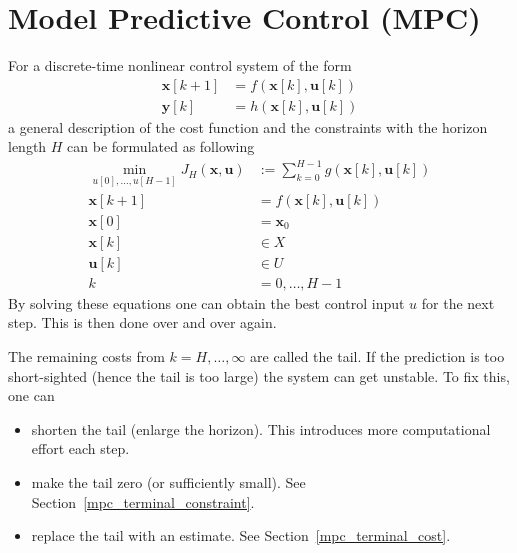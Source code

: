 \section{Model Predictive Control (MPC)}

For a discrete-time nonlinear control system of the form
\begin{align*}
    \mathbf{x}[k+1] & = f(\mathbf{x}[k], \mathbf{u}[k]) \\
    \mathbf{y}[k]   & = h(\mathbf{x}[k],\mathbf{u}[k])
\end{align*}
a general description of the cost function and the constraints with the horizon length $H$ can be formulated as following
\begin{align*}
    \min_{u[0], \ldots, u[H-1]} J_{H}(\mathbf{x,u}) & := \sum_{k=0}^{H-1}g(\mathbf{x}[k],\mathbf{u}[k]) \\
    \mathbf{x}[k+1]                                 & = f(\mathbf{x}[k], \mathbf{u}[k])                 \\
    \mathbf{x}[0]                                   & = \mathbf{x}_0                                    \\
    \mathbf{x}[k]                                   & \in X                                             \\
    \mathbf{u}[k]                                   & \in U                                             \\
    k                                               & = 0,\ldots,H-1
\end{align*}
By solving these equations one can obtain the best control input $u$ for the next step. This is then done over and over again.

\newpar{}

The remaining costs from $k=H, \ldots, \infty$ are called the tail. If the prediction is too short-sighted (hence the tail is too large) the system can get unstable. To fix this, one can
\begin{itemize}
    \item shorten the tail (enlarge the horizon). This introduces more computational effort each step.
    \item make the tail zero (or sufficiently small). See Section~\ref{mpc_terminal_constraint}.
    \item replace the tail with an estimate. See Section~\ref{mpc_terminal_cost}.
\end{itemize}

